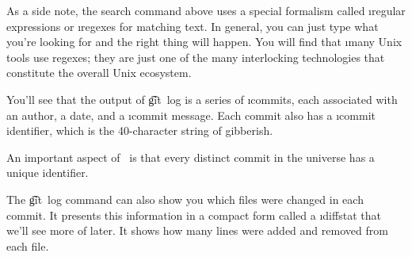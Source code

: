 \documentclass[letterpaper,12pt,titlepage]{article}
\begin{document}
As a side note, the search command above uses a special formalism called
\i{regular expressions} or \i{regexes} for matching text. In general, you can
just type what you're looking for and the right thing will happen. You will
find that \i{many} Unix tools use regexes; they are just one of the many
interlocking technologies that constitute the overall Unix ecosystem.


You'll see that the output of \t{git~log} is a series of \i{commits}, each
associated with an author, a date, and a \i{commit message}. Each commit also
has a \i{commit identifier}, which is the 40-character string of gibberish.


An important aspect of \git\ is that every distinct commit in the universe has
a unique identifier.


The \t{git~log} command can also show you which files were changed in each
commit. It presents this information in a compact form called a \i{diffstat}
that we'll see more of later. It shows how many lines were added and removed
from each file.


\end{document}
